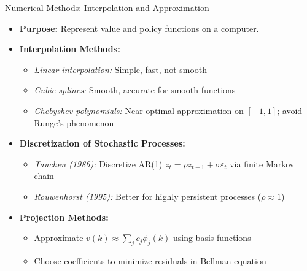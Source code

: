 \documentclass[10pt,english,aspectratio=169]{beamer}
\begin{document}
\begin{frame}{Numerical Methods: Interpolation and Approximation}
\begin{itemize}
\item \textbf{Purpose:} Represent value and policy functions on a computer.

\medskip
\item \textbf{Interpolation Methods:}
\begin{itemize}
    \item \emph{Linear interpolation:} Simple, fast, not smooth
    \item \emph{Cubic splines:} Smooth, accurate for smooth functions
    \item \emph{Chebyshev polynomials:} Near-optimal approximation on $[-1,1]$; avoid Runge's phenomenon
\end{itemize}

\medskip
\item \textbf{Discretization of Stochastic Processes:}
\begin{itemize}
    \item \emph{Tauchen (1986):} Discretize AR(1) $z_t = \rho z_{t-1} + \sigma \varepsilon_t$ via finite Markov chain
    \item \emph{Rouwenhorst (1995):} Better for highly persistent processes ($\rho \approx 1$)
\end{itemize}

\medskip
\item \textbf{Projection Methods:}
\begin{itemize}
    \item Approximate $v(k) \approx \sum_j c_j \phi_j(k)$ using basis functions
    \item Choose coefficients to minimize residuals in Bellman equation
\end{itemize}
\end{itemize}
\end{frame}
\end{document}
